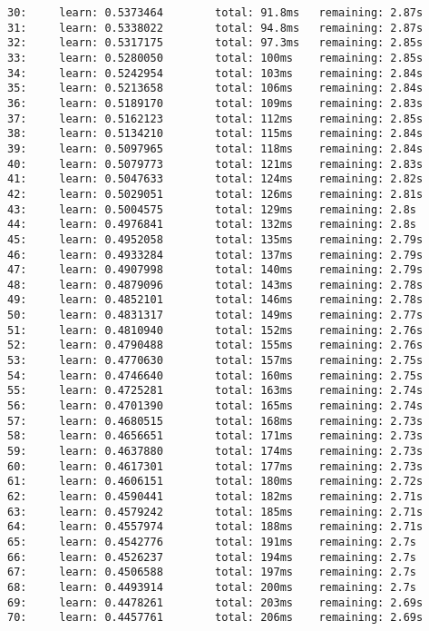 \documentclass[11pt]{article}
\begin{document}
\begin{Verbatim}[commandchars=\\\{\}]
30:     learn: 0.5373464        total: 91.8ms   remaining: 2.87s
31:     learn: 0.5338022        total: 94.8ms   remaining: 2.87s
32:     learn: 0.5317175        total: 97.3ms   remaining: 2.85s
33:     learn: 0.5280050        total: 100ms    remaining: 2.85s
34:     learn: 0.5242954        total: 103ms    remaining: 2.84s
35:     learn: 0.5213658        total: 106ms    remaining: 2.84s
36:     learn: 0.5189170        total: 109ms    remaining: 2.83s
37:     learn: 0.5162123        total: 112ms    remaining: 2.85s
38:     learn: 0.5134210        total: 115ms    remaining: 2.84s
39:     learn: 0.5097965        total: 118ms    remaining: 2.84s
40:     learn: 0.5079773        total: 121ms    remaining: 2.83s
41:     learn: 0.5047633        total: 124ms    remaining: 2.82s
42:     learn: 0.5029051        total: 126ms    remaining: 2.81s
43:     learn: 0.5004575        total: 129ms    remaining: 2.8s
44:     learn: 0.4976841        total: 132ms    remaining: 2.8s
45:     learn: 0.4952058        total: 135ms    remaining: 2.79s
46:     learn: 0.4933284        total: 137ms    remaining: 2.79s
47:     learn: 0.4907998        total: 140ms    remaining: 2.79s
48:     learn: 0.4879096        total: 143ms    remaining: 2.78s
49:     learn: 0.4852101        total: 146ms    remaining: 2.78s
50:     learn: 0.4831317        total: 149ms    remaining: 2.77s
51:     learn: 0.4810940        total: 152ms    remaining: 2.76s
52:     learn: 0.4790488        total: 155ms    remaining: 2.76s
53:     learn: 0.4770630        total: 157ms    remaining: 2.75s
54:     learn: 0.4746640        total: 160ms    remaining: 2.75s
55:     learn: 0.4725281        total: 163ms    remaining: 2.74s
56:     learn: 0.4701390        total: 165ms    remaining: 2.74s
57:     learn: 0.4680515        total: 168ms    remaining: 2.73s
58:     learn: 0.4656651        total: 171ms    remaining: 2.73s
59:     learn: 0.4637880        total: 174ms    remaining: 2.73s
60:     learn: 0.4617301        total: 177ms    remaining: 2.73s
61:     learn: 0.4606151        total: 180ms    remaining: 2.72s
62:     learn: 0.4590441        total: 182ms    remaining: 2.71s
63:     learn: 0.4579242        total: 185ms    remaining: 2.71s
64:     learn: 0.4557974        total: 188ms    remaining: 2.71s
65:     learn: 0.4542776        total: 191ms    remaining: 2.7s
66:     learn: 0.4526237        total: 194ms    remaining: 2.7s
67:     learn: 0.4506588        total: 197ms    remaining: 2.7s
68:     learn: 0.4493914        total: 200ms    remaining: 2.7s
69:     learn: 0.4478261        total: 203ms    remaining: 2.69s
70:     learn: 0.4457761        total: 206ms    remaining: 2.69s

\end{Verbatim}
\end{document}
